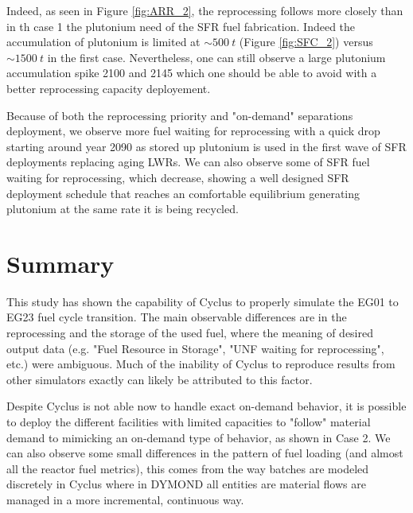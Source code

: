 \documentclass[12pt]{article}
\begin{document}
Indeed, as seen in Figure \ref{fig:ARR_2}, the reprocessing follows more closely
than in th case 1 the plutonium need of the SFR fuel fabrication. Indeed the
accumulation of plutonium is limited at $\sim500~t$ (Figure \ref{fig:SFC_2}) versus $\sim1500~t$ in the
first case. Nevertheless, one can still observe a large plutonium accumulation
spike 2100 and 2145 which one should be able to avoid with a better reprocessing
capacity deployement.

Because of both the reprocessing priority and "on-demand" separations
deployment, we observe more fuel waiting for reprocessing with a quick drop
starting around year 2090 as stored up plutonium is used in the first wave of
SFR deployments replacing aging LWRs. We can also observe some of SFR fuel
waiting for reprocessing, which decrease, showing a well designed SFR
deployment schedule that reaches an comfortable equilibrium generating
plutonium at the same rate it is being recycled.

\section{Summary}

This study has shown the capability of Cyclus to properly simulate the EG01 to
EG23 fuel cycle transition.  The main observable differences are in the
reprocessing and the storage of the used fuel, where the meaning of desired
output data (e.g. "Fuel Resource in Storage", "UNF waiting for reprocessing",
etc.) were ambiguous.  Much of the inability of Cyclus to reproduce results
from other simulators exactly can likely be attributed to this factor.

Despite Cyclus is not able now to handle exact on-demand behavior, it is
possible to deploy the different facilities with limited capacities to
"follow" material demand to mimicking an on-demand type of behavior, as shown
in Case 2.  We can also observe some small differences in the pattern of fuel
loading (and almost all the reactor fuel metrics), this comes from the way
batches are modeled discretely in Cyclus where in DYMOND all entities are
material flows are managed in a more incremental, continuous way.






\end{document}
